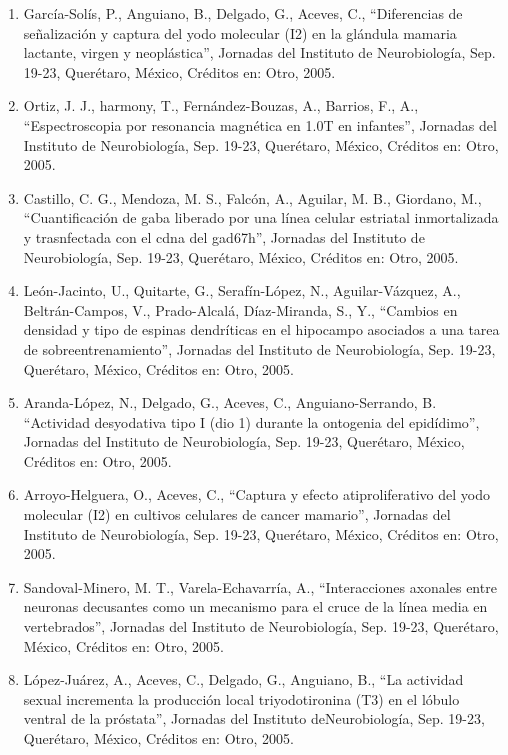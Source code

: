\begin{enumerate}
\item García-Solís, P., Anguiano, B., Delgado, G., Aceves, C., “Diferencias de señalización y captura del yodo molecular (I2) en la glándula 
mamaria lactante, virgen y neoplástica”, Jornadas del Instituto de Neurobiología, Sep. 19-23, Querétaro, México, Créditos en: Otro, 2005.

\item Ortiz, J. J., harmony, T., Fernández-Bouzas, A., Barrios, F., A., “Espectroscopia por resonancia magnética en 1.0T en infantes”, 
Jornadas del 
Instituto de Neurobiología, Sep. 19-23, Querétaro, México, Créditos en: Otro, 2005.

\item Castillo, C. G., Mendoza, M. S., Falcón, A., Aguilar, M. B., Giordano, M., “Cuantificación de gaba liberado por una línea celular 
estriatal 
inmortalizada y trasnfectada con el cdna del gad67h”, Jornadas del Instituto de Neurobiología, Sep. 19-23, Querétaro, México, Créditos en: 
Otro, 2005.

\item León-Jacinto, U., Quitarte, G., Serafín-López, N., Aguilar-Vázquez, A., Beltrán-Campos, V., Prado-Alcalá, Díaz-Miranda, S., Y., 
“Cambios en 
densidad y tipo de espinas dendríticas en el hipocampo asociados a una tarea de sobreentrenamiento”, Jornadas del Instituto de Neurobiología, 
Sep. 19-23, Querétaro, México, Créditos en: Otro, 2005.

\item Aranda-López, N., Delgado, G., Aceves, C., Anguiano-Serrando, B. “Actividad desyodativa tipo I (dio 1) durante la ontogenia del 
epidídimo”, 
Jornadas del Instituto de Neurobiología, Sep. 19-23, Querétaro, México, Créditos en: Otro, 2005.

\item Arroyo-Helguera, O., Aceves, C., “Captura y efecto atiproliferativo del yodo molecular (I2) en cultivos celulares de cancer mamario”, 
Jornadas del Instituto de Neurobiología, Sep. 19-23, Querétaro, México, Créditos en: Otro, 2005.

\item Sandoval-Minero, M. T., Varela-Echavarría, A., “Interacciones axonales entre neuronas decusantes como un mecanismo para el cruce de la 
línea 
media en vertebrados”, Jornadas del Instituto de Neurobiología, Sep. 19-23, Querétaro, México, Créditos en: Otro, 2005.

\item López-Juárez, A., Aceves, C., Delgado, G., Anguiano, B., “La actividad sexual incrementa la producción local triyodotironina (T3) en el 
lóbulo ventral de la próstata”, Jornadas del Instituto deNeurobiología, Sep. 19-23, Querétaro, México, Créditos en: Otro, 2005.


\end{enumerate}
